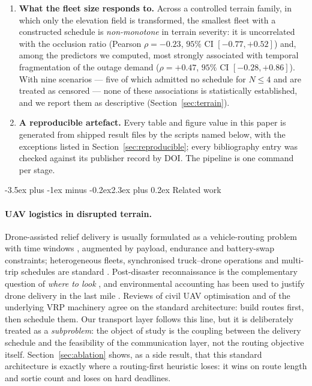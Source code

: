 \documentclass[11pt]{article}
\makeatletter
\def\section{\@startsection{section}{1}{\z@}%
    {1.0\baselineskip plus 0.25\baselineskip minus 0.25\baselineskip}%
    {0.4\baselineskip}%
    {\normalfont\normalsize\centering\bfseries}}%
\renewcommand{\section}{\@startsection{section}{1}{\z@}%
      {-3.5ex plus -1ex minus -0.2ex}{2.3ex plus 0.2ex}%
      {\normalfont\Large\bfseries}}%
\renewcommand{\section}{\@startsection{section}{1}{\z@}%
      {-3.5ex plus -1ex minus -0.2ex}{2.3ex plus 0.2ex}%
      {\normalfont\large\bfseries}}%
\theoremstyle{dshplain}
\theoremstyle{dshdefn}
\makeatother
\begin{document}
\begin{enumerate}[leftmargin=1.8em,itemsep=2pt]
  run under the \emph{same} scheduler it wins the routing layer but violates hard
  deadlines by $\ENcwHard$\,s (Section~\ref{sec:ablation}). Both results argue for
  keeping scheduling inside the search loop.
\item \textbf{What the fleet size responds to.} Across a controlled terrain
  family, in which only the elevation field is transformed, the smallest fleet
  with a constructed schedule is \emph{non-monotone} in terrain severity: it is
  uncorrelated with the occlusion ratio (Pearson $\rho=-0.23$, $95\%$ CI
  $[-0.77,+0.52]$) and, among the predictors we computed, most strongly
  associated with temporal fragmentation of the outage demand
  ($\rho=+0.47$, $95\%$ CI $[-0.28,+0.86]$). With nine scenarios --- five of
  which admitted no schedule for $N\le4$ and are treated as censored --- none of
  these associations is statistically established, and we report them as
  descriptive (Section~\ref{sec:terrain}).
\item \textbf{A reproducible artefact.} {\sloppy Every table and figure value in
  this paper is generated from shipped result files by the scripts named below,
  with the exceptions listed in
  Section~\ref{sec:reproducible}; every bibliography entry was checked against its
  publisher record by DOI. The pipeline is one command per stage.}\par
\end{enumerate}

\section{Related work}
\label{sec:related}
\paragraph{UAV logistics in disrupted terrain.}
Drone-assisted relief delivery is usually formulated as a vehicle-routing
problem with time windows \cite{solomon1987}, augmented by payload, endurance
and battery-swap constraints; heterogeneous fleets, synchronised truck--drone
operations and multi-trip schedules are standard
\cite{murray,poikonen2017,otto2018,macrina2020,das2021,bian2024,coutinho,boysen,
erdelj,scott2018}. Post-disaster reconnaissance is the complementary question of
\emph{where to look} \cite{oruc2018}, and environmental accounting has been used
to justify drone delivery in the last mile \cite{goodchild2018}. Reviews of civil
UAV optimisation \cite{otto2018,macrina2020} and of the underlying VRP machinery
\cite{tothvigo2002,vidal2020,clarke1964} agree on the standard architecture:
build routes first, then schedule them. Our transport layer follows this line,
but it is deliberately treated as a \emph{subproblem}: the object of study is the
coupling between the delivery schedule and the feasibility of the communication
layer, not the routing objective itself. Section~\ref{sec:ablation} shows, as a
side result, that this standard architecture is exactly where a routing-first
heuristic loses: it wins on route length and sortie count and loses on hard
deadlines.
\end{document}
